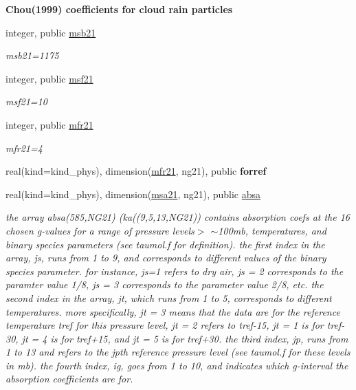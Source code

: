 \begin{Indent}\textbf{ Chou(1999) coefficients for cloud rain particles}\par
\begin{DoxyCompactItemize}
\item 
integer, public \hyperlink{group__module__radsw__kgbnn_ga59710ca5b31c30385ea968c0f01e2e81}{msb21}
\begin{DoxyCompactList}\small\item\em msb21=1175 \end{DoxyCompactList}\item 
integer, public \hyperlink{group__module__radsw__kgbnn_gae70b5abfa847419cbf189d2502c34ddd}{msf21}
\begin{DoxyCompactList}\small\item\em msf21=10 \end{DoxyCompactList}\item 
integer, public \hyperlink{group__module__radsw__kgbnn_ga5575239aa9d55abcca1ac1f82dc4c4ec}{mfr21}
\begin{DoxyCompactList}\small\item\em mfr21=4 \end{DoxyCompactList}\item 
real(kind=kind\+\_\+phys), dimension(\hyperlink{group__module__radsw__kgbnn_ga5575239aa9d55abcca1ac1f82dc4c4ec}{mfr21}, ng21), public {\bfseries forref}
\item 
real(kind=kind\+\_\+phys), dimension(\hyperlink{namespacemodule__radsw__kgb21_a235b17e9b4b37668028c572f80e1188a}{msa21}, ng21), public \hyperlink{group__module__radsw__kgbnn_ga7cce83c282d3efec6a3fe319480c270a}{absa}
\begin{DoxyCompactList}\small\item\em the array absa(585,\+N\+G21) (ka((9,5,13,\+N\+G21)) contains absorption coefs at the 16 chosen g-\/values for a range of pressure levels$>$ $\sim$100mb, temperatures, and binary species parameters (see taumol.\+f for definition). the first index in the array, js, runs from 1 to 9, and corresponds to different values of the binary species parameter. for instance, js=1 refers to dry air, js = 2 corresponds to the paramter value 1/8, js = 3 corresponds to the parameter value 2/8, etc. the second index in the array, jt, which runs from 1 to 5, corresponds to different temperatures. more specifically, jt = 3 means that the data are for the reference temperature tref for this pressure level, jt = 2 refers to tref-\/15, jt = 1 is for tref-\/30, jt = 4 is for tref+15, and jt = 5 is for tref+30. the third index, jp, runs from 1 to 13 and refers to the jpth reference pressure level (see taumol.\+f for these levels in mb). the fourth index, ig, goes from 1 to 10, and indicates which g-\/interval the absorption coefficients are for. \end{DoxyCompactList}\item 

\end{DoxyCompactItemize}
\end{Indent}
